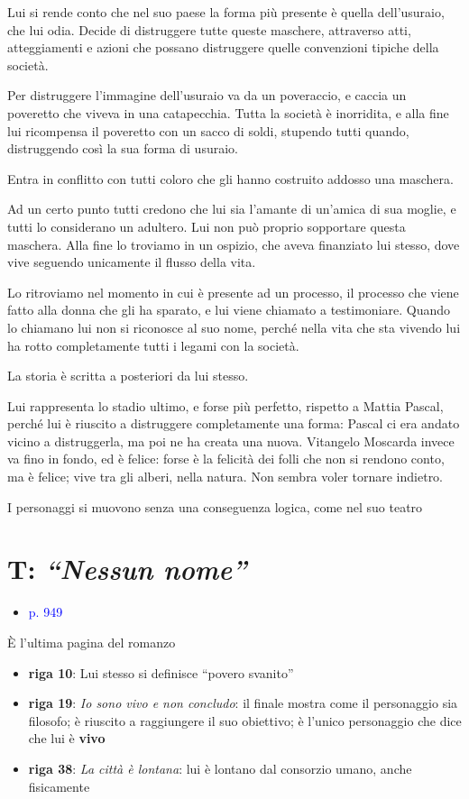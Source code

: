 \documentclass[a4paper, twoside, titlepage]{book}
\newcommand{\elenco}[1]{%
\begin{itemize}
#1
\end{itemize}}
\renewcommand{\emph}[1]{\textcolor{blue}{#1}}
\begin{document}
Lui si rende conto che nel suo paese la forma più presente è quella dell’usuraio, che lui odia.
Decide di distruggere tutte queste maschere, attraverso atti, atteggiamenti e azioni che possano distruggere quelle convenzioni tipiche della società.

Per distruggere l’immagine dell’usuraio va da un poveraccio, e caccia un poveretto che viveva in una catapecchia. Tutta la società è inorridita, e alla fine lui ricompensa il poveretto con un sacco di soldi, stupendo tutti quando, distruggendo così la sua forma di usuraio.

Entra in conflitto con tutti coloro che gli hanno costruito addosso una maschera.

Ad un certo punto tutti credono che lui sia l’amante di un’amica di sua moglie, e tutti lo considerano un adultero. Lui non può proprio sopportare questa maschera.
Alla fine lo troviamo in un ospizio, che aveva finanziato lui stesso, dove vive seguendo unicamente il flusso della vita.

Lo ritroviamo nel momento in cui è presente ad un processo, il processo che viene fatto alla donna che gli ha sparato, e lui viene chiamato a testimoniare.
Quando lo chiamano lui non si riconosce al suo nome, perché nella vita che sta vivendo lui ha rotto completamente tutti i legami con la società.

La storia è scritta a posteriori da lui stesso.

Lui rappresenta lo stadio ultimo, e forse più perfetto, rispetto a Mattia Pascal, perché lui è riuscito a distruggere completamente una forma: Pascal ci era andato vicino a distruggerla, ma poi ne ha creata una nuova.
Vitangelo Moscarda invece va fino in fondo, ed è felice: forse è la felicità dei folli che non si rendono conto, ma è felice; vive tra gli alberi, nella natura.
Non sembra voler tornare indietro.

I personaggi si muovono senza una conseguenza logica, come nel suo teatro

\section{T: \textit{“Nessun nome”}}
\elenco{\item \emph{p. 949}}

È l’ultima pagina del romanzo

\elenco{\item \textbf{riga 10}: Lui stesso si definisce “povero svanito”
\item \textbf{riga 19}: \textit{Io sono vivo e non concludo}: il finale mostra come il personaggio sia filosofo; è riuscito a raggiungere il suo obiettivo; è l’unico personaggio che dice che lui è \textbf{vivo}
\item \textbf{riga 38}: \textit{La città è lontana}: lui è lontano dal consorzio umano, anche fisicamente}
\end{document}

